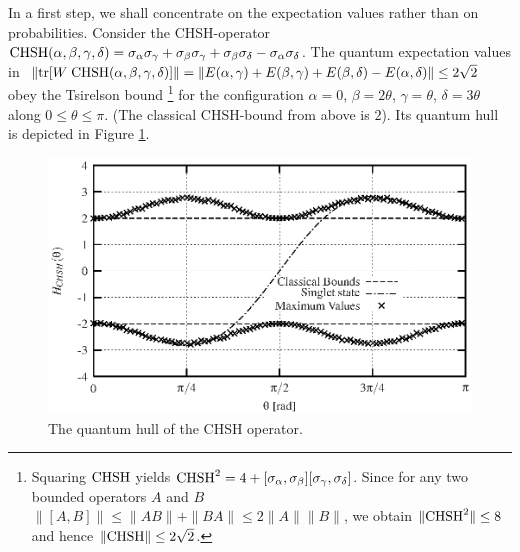 In a first step, we shall concentrate on the expectation values
rather than on probabilities.
Consider the CHSH-operator
$
  {\rm CHSH}(\alpha ,\beta ,\gamma ,\delta )=
\sigma_\alpha \sigma_\gamma + \sigma_\beta \sigma_\gamma +
  \sigma_\beta \sigma_\delta - \sigma_\alpha \sigma_\delta
$.
The quantum expectation values in
$ \|{\rm tr}[W\;{\rm CHSH}(\alpha ,\beta ,\gamma ,\delta )] \| = \|E(\alpha,\gamma) +
  E(\beta,\gamma) + E(\beta,\delta) - E(\alpha,\delta)\| \leq 2\sqrt{2}$
obey the Tsirelson bound
\footnote{Squaring ${\rm CHSH}$ yields  \cite[p. 174]{peres}
$
  {\rm CHSH}^2=4+[\sigma_\alpha,\sigma_\beta][\sigma_\gamma,\sigma_\delta]
$.
Since  for any two bounded
operators $A$ and $B$
$
  \|[A,B]\| \leq \|A B\| + \|B A\| \leq 2\|A\|\|B\|
$,
we obtain $\| {\rm CHSH}^2 \| \leq 8$ and hence
$  \|{\rm CHSH}\| \leq 2\sqrt{2}$.
}
for the configuration
$\alpha=0$,
$\beta=2\theta$,
$\gamma=\theta$,
$\delta=3\theta$ along $0 \le \theta \le \pi$.
(The classical CHSH-bound from above is $2$).
Its quantum hull is depicted in Figure  \ref{f-2003-qpoly-2}.
\begin{figure}[!ht]
  \centering
  \includegraphics{2003-qpoly-plotchsh}
  \caption{The quantum hull of the CHSH operator.}
  \label{f-2003-qpoly-2}
\end{figure}


